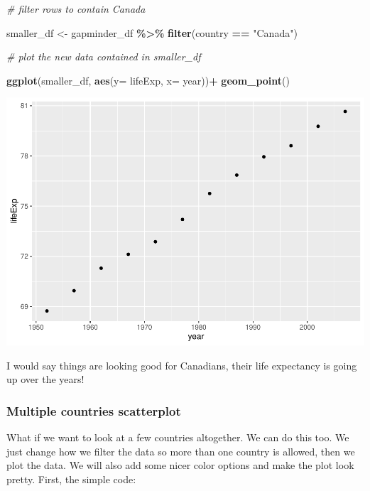 \documentclass[
]{book}
\newenvironment{Shaded}{\begin{snugshade}}{\end{snugshade}}
\newcommand{\AttributeTok}[1]{\textcolor[rgb]{0.13,0.29,0.53}{#1}}
\newcommand{\CommentTok}[1]{\textcolor[rgb]{0.56,0.35,0.01}{\textit{#1}}}
\newcommand{\FunctionTok}[1]{\textcolor[rgb]{0.13,0.29,0.53}{\textbf{#1}}}
\newcommand{\NormalTok}[1]{#1}
\newcommand{\OtherTok}[1]{\textcolor[rgb]{0.56,0.35,0.01}{#1}}
\newcommand{\SpecialCharTok}[1]{\textcolor[rgb]{0.81,0.36,0.00}{\textbf{#1}}}
\newcommand{\StringTok}[1]{\textcolor[rgb]{0.31,0.60,0.02}{#1}}
\begin{document}
\begin{Shaded}
\begin{Highlighting}[]
\CommentTok{\# filter rows to contain Canada}

\NormalTok{smaller\_df }\OtherTok{\textless{}{-}}\NormalTok{ gapminder\_df }\SpecialCharTok{\%\textgreater{}\%} 
                 \FunctionTok{filter}\NormalTok{(country }\SpecialCharTok{==} \StringTok{"Canada"}\NormalTok{)}

\CommentTok{\# plot the new data contained in smaller\_df}

\FunctionTok{ggplot}\NormalTok{(smaller\_df, }\FunctionTok{aes}\NormalTok{(}\AttributeTok{y=}\NormalTok{ lifeExp, }\AttributeTok{x=}\NormalTok{ year))}\SpecialCharTok{+}
  \FunctionTok{geom\_point}\NormalTok{()}
\end{Highlighting}
\end{Shaded}

\includegraphics{Statistics_Lab_files/figure-latex/1scatterB-1.pdf}

I would say things are looking good for Canadians, their life expectancy is going up over the years!

\hypertarget{multiple-countries-scatterplot}{%
\subsubsection{Multiple countries scatterplot}\label{multiple-countries-scatterplot}}

What if we want to look at a few countries altogether. We can do this too. We just change how we filter the data so more than one country is allowed, then we plot the data. We will also add some nicer color options and make the plot look pretty. First, the simple code:
\end{document}
